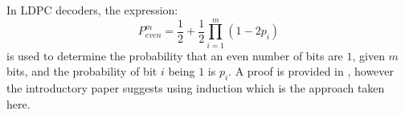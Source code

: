 \documentclass{article}
\begin{document}
In LDPC decoders, the expression:
\begin{equation} \label{eq:prob_even}
P_{even}^{m}=\frac{1}{2}+\frac{1}{2}\prod_{i=1}^{m}(1-2p_{i})
\end{equation}
is used to determine the probability that an even number of bits are $1$, given $m$ bits, and the probability of bit $i$ being $1$ is $p_i$.  A proof is provided in \cite{gallager1963low}, however the introductory paper \cite{ryan2004introduction} suggests using induction which is the approach taken here.



\end{document}
